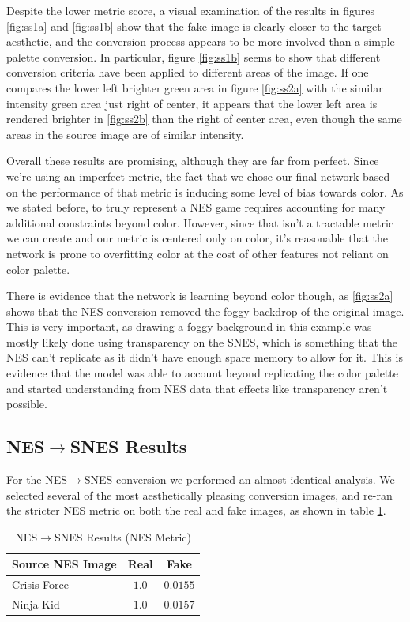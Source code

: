 \documentclass[10pt,twocolumn,letterpaper]{article}
\begin{document}
Despite the lower metric score, a visual examination of the results in figures \ref{fig:ss1a} and \ref{fig:ss1b} show that the fake image is clearly closer to the target aesthetic, and the conversion process appears to be more involved than a simple palette conversion.
In particular, figure \ref{fig:ss1b} seems to show that different conversion criteria have been applied to different areas of the image. If one compares the lower left brighter green area in figure \ref{fig:ss2a} with the similar intensity green area just right of center, it appears that the lower left area is rendered brighter in \ref{fig:ss2b} than the right of center area, even though the same areas in the source image are of similar intensity.

Overall these results are promising, although they are far from perfect. Since we're using an imperfect metric, the fact that we chose our final network based on the performance of that metric is inducing some level of bias towards color. As we stated before, to truly represent a NES game requires accounting for many additional constraints beyond color. However, since that isn't a tractable metric we can create and our metric is centered only on color, it's reasonable that the network is prone to overfitting color at the cost of other features not reliant on color palette.

There is evidence that the network is learning beyond color though, as \ref{fig:ss2a} shows that the NES conversion removed the foggy backdrop of the original image. This is very important, as drawing a foggy background in this example was mostly likely done using transparency on the SNES, which is something that the NES can't replicate as it didn't have enough spare memory to allow for it. This is evidence that the model was able to account beyond replicating the color palette and started understanding from NES data that effects like transparency aren't possible.


\subsection{NES$\rightarrow$SNES Results}

For the NES$\rightarrow$SNES conversion we performed an almost identical analysis. We selected several of the most aesthetically pleasing conversion images, and re-ran the stricter NES metric on both the real and fake images, as shown in table \ref{tab:snesresults}.

\begin{table}[H]
   \begin{center}
      \begin{tabular}{|l|c|c|}
         \hline
         Source NES Image & Real  & Fake     \\
         \hline\hline
         Crisis Force     & $1.0$ & $0.0155$ \\
         Ninja Kid        & $1.0$ & $0.0157$ \\
         \hline
      \end{tabular}
   \end{center}
   \caption{NES$\rightarrow$SNES Results (NES Metric)}
   \label{tab:snesresults}
\end{table}
\end{document}
